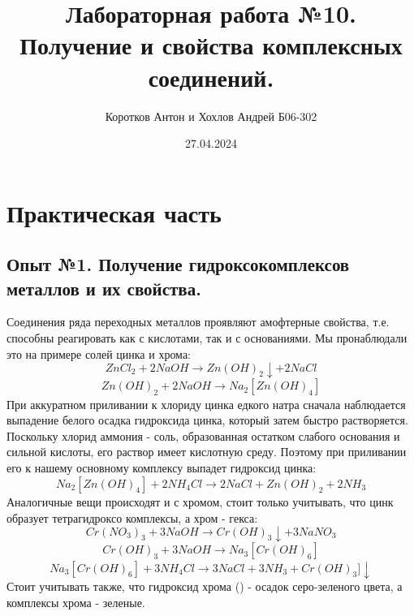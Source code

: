 \documentclass[a4paper,12pt]{article}
\title{\textbf{Лабораторная работа №10. Получение и свойства комплексных соединений.}}
\author{Коротков Антон и Хохлов Андрей Б06-302 }
\date{27.04.2024}
\newcommand{\RomanNumeralCaps}[1]
    {\MakeUppercase{\romannumeral #1}}
\begin{document}
	
	\maketitle


\section{Практическая часть}
\subsection{Опыт №1. Получение гидроксокомплексов металлов и их свойства.}
Соединения ряда переходных металлов проявляют амофтерные свойства, т.е. способны реагировать как с кислотами, так и с основаниями. Мы пронаблюдали это на примере солей цинка и хрома:
\begin{equation}
    ZnCl_2 + 2NaOH \xrightarrow[]{} Zn(OH)_2\downarrow + 2NaCl
\end{equation}
\begin{equation}
    Zn(OH)_2 + 2NaOH \xrightarrow[]{} Na_2[Zn(OH)_4]
\end{equation}
При аккуратном приливании к хлориду цинка едкого натра сначала наблюдается выпадение белого осадка гидроксида цинка, который затем быстро растворяется.\newline
Поскольку хлорид аммония - соль, образованная остатком слабого основания и сильной кислоты, его раствор имеет кислотную среду. Поэтому при приливании его к нашему основному комплексу выпадет гидроксид цинка:
\begin{equation}
    Na_2[Zn(OH)_4] + 2NH_4Cl \xrightarrow[]{} 2NaCl + Zn(OH)_2 + 2NH_3
\end{equation}
Аналогичные вещи происходят и с хромом, стоит только учитывать, что цинк образует тетрагидроксо комплексы, а хром - гекса:
\begin{equation}
    Cr(NO_3)_3 + 3NaOH \xrightarrow[]{} Cr(OH)_3\downarrow + 3NaNO_3
\end{equation}
\begin{equation}
    Cr(OH)_3 + 3NaOH \xrightarrow[]{} Na_3[Cr(OH)_6]
\end{equation}
\begin{equation}
    Na_3[Cr(OH)_6] + 3NH_4Cl \xrightarrow[]{} 3NaCl + 3NH_3 + Cr(OH)_3]\downarrow
\end{equation}
Стоит учитывать также, что гидроксид хрома (\RomanNumeralCaps{3}) - осадок серо-зеленого цвета, а комплексы хрома - зеленые.
\end{document}
